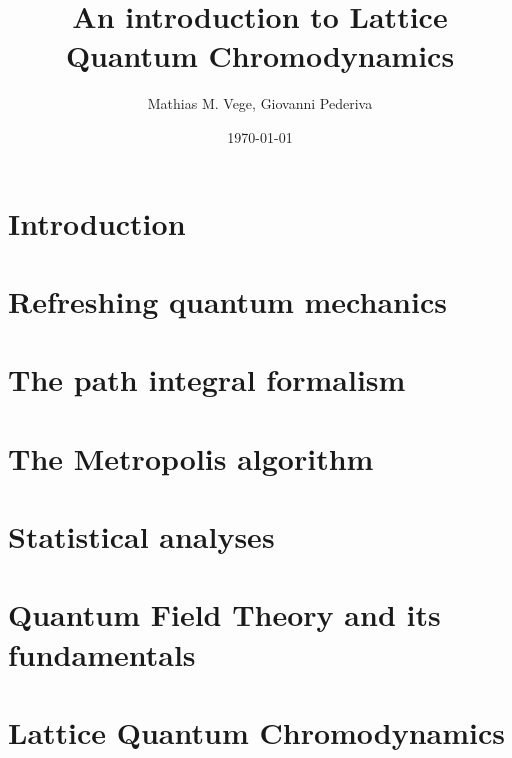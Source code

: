 \documentclass[11pt]{article}
\title{An introduction to Lattice Quantum Chromodynamics}
\author{Mathias M. Vege, Giovanni Pederiva}
\date{\today}
\begin{document}
\maketitle

\begin{abstract}

\end{abstract}


\section{Introduction}


\section{Refreshing quantum mechanics}


\section{The path integral formalism}


\section{The Metropolis algorithm}


\section{Statistical analyses}


\section{Quantum Field Theory and its fundamentals}


\section{Lattice Quantum Chromodynamics}




\end{document}
